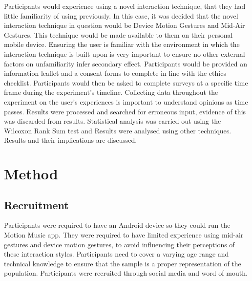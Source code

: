 \documentclass{l4proj}
\begin{document}
Participants would experience using a novel interaction technique, that they had little familiarity of using previously. In this case, it was decided that the novel interaction technique in question would be Device Motion Gestures and Mid-Air Gestures. This technique would be made available to them on their personal mobile device. Ensuring the user is familiar with the environment in which the interaction technique is built upon is very important to ensure no other external factors on unfamiliarity infer secondary effect. Participants would be provided an information leaflet and a consent forms to complete in line with the ethics checklist. Participants would then be asked to complete surveys at a specific time frame during the experiment’s timeline. Collecting data throughout the experiment on the user’s experiences is important to understand opinions as time passes. Results were processed and searched for erroneous input, evidence of this was discarded from results. Statistical analysis was carried out using the Wilcoxon Rank Sum test and Results were analysed using other techniques. Results and their implications are discussed.


\section{Method}

\subsection{Recruitment}

Participants were required to have an Android device so they could run the Motion Music app. They were required to have limited experience using mid-air gestures and device motion gestures, to avoid influencing their perceptions of these interaction styles. Participants need to cover a varying age range and technical knowledge to ensure that the sample is a proper representation of the population. Participants were recruited through social media and word of mouth.
\end{document}
